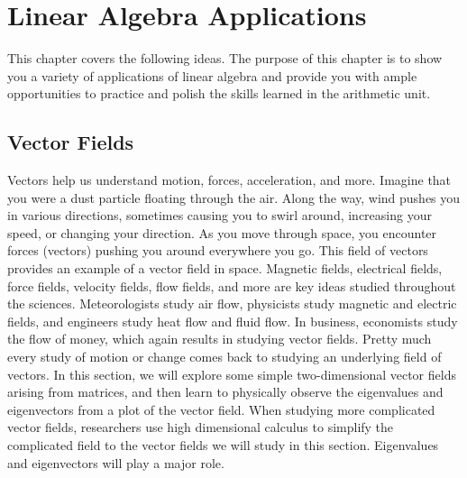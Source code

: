 
\chapter{Linear Algebra Applications}

This chapter covers the following ideas.  The purpose of this chapter
is to show you a variety of applications of linear algebra and provide you with ample opportunities to practice and polish the skills learned in the arithmetic unit.  






\section{Vector Fields}

Vectors help us understand motion, forces, acceleration, and more. Imagine that you were a dust particle floating through the air.  Along the way, wind pushes you in various directions, sometimes causing you to swirl around, increasing your speed, or changing your direction. As you move through space, you encounter forces (vectors) pushing you around everywhere you go. This field of vectors provides an example of a vector field in space.  Magnetic fields, electrical fields, force fields, velocity fields, flow fields, and more are key ideas studied throughout the sciences. Meteorologists study air flow, physicists study magnetic and electric fields, and engineers study heat flow and fluid flow. In business, economists study the flow of money, which again results in studying vector fields. Pretty much every study of motion or change comes back to studying an underlying field of vectors.  In this section, we will explore some simple two-dimensional vector fields arising from matrices, and then learn to physically observe the eigenvalues and eigenvectors from a plot of the vector field.  When studying more complicated vector fields, researchers use high dimensional calculus to simplify the complicated field to the vector fields we will study in this section. Eigenvalues and eigenvectors will play a major role.

